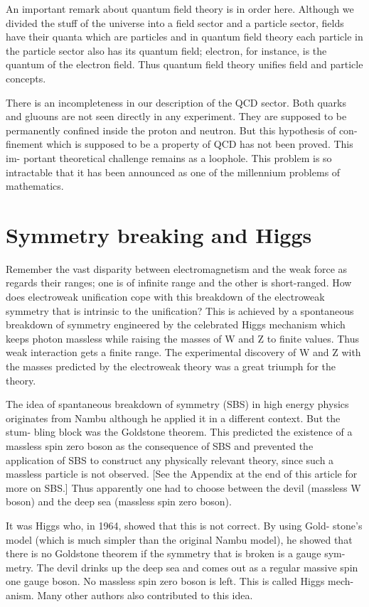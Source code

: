 An important remark about quantum field theory is in order here. Although
we divided the stuff of the universe into a field sector and a particle sector, fields
have their quanta which are particles and in quantum field theory each particle in
the particle sector also has its quantum field; electron, for instance, is the quantum
of the electron field. Thus quantum field theory unifies field and particle concepts.


There is an incompleteness in our description of the QCD sector. Both quarks
and gluouns are not seen directly in any experiment. They are supposed to be
permanently confined inside the proton and neutron. But this hypothesis of con-
finement which is supposed to be a property of QCD has not been proved. This im-
portant theoretical challenge remains as a loophole. This problem is so intractable
that it has been announced as one of the millennium problems of mathematics.


\section{Symmetry breaking and Higgs}


Remember the vast disparity between electromagnetism and the weak force
as regards their ranges; one is of infinite range and the other is short-ranged.
How does electroweak unification cope with this breakdown of the electroweak
symmetry that is intrinsic to the unification? This is achieved by a spontaneous
breakdown of symmetry engineered by the celebrated Higgs mechanism which keeps photon massless while raising the masses of W and Z to finite values. Thus
weak interaction gets a finite range. The experimental discovery of W and Z with
the masses predicted by the electroweak theory was a great triumph for the theory.


The idea of spantaneous breakdown of symmetry (SBS) in high energy physics
originates from Nambu although he applied it in a different context. But the stum-
bling block was the Goldstone theorem. This predicted the existence of a massless
spin zero boson as the consequence of SBS and prevented the application of SBS
to construct any physically relevant theory, since such a massless particle is not
observed. [See the Appendix at the end of this article for more on SBS.] Thus
apparently one had to choose between the devil (massless W boson) and the deep
sea (massless spin zero boson).


It was Higgs who, in 1964, showed that this is not correct. By using Gold-
stone’s model (which is much simpler than the original Nambu model), he showed
that there is no Goldstone theorem if the symmetry that is broken is a gauge sym-
metry. The devil drinks up the deep sea and comes out as a regular massive spin
one gauge boson. No massless spin zero boson is left. This is called Higgs mech-
anism. Many other authors also contributed to this idea.

